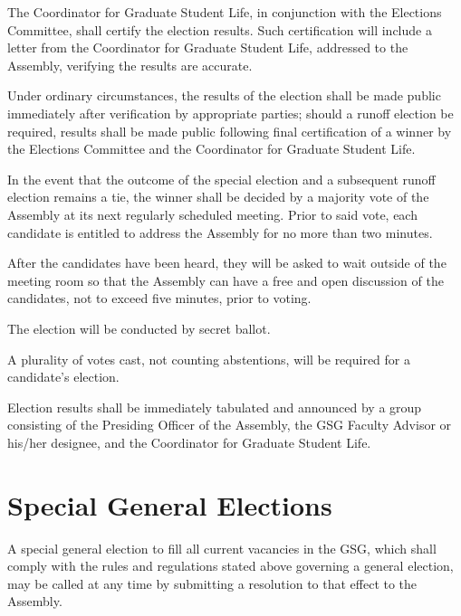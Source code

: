 \begin{bylaws-number}
\begin{bylaws-number}
  \end{bylaws-number}
  \item The Coordinator for Graduate Student Life, in conjunction with the Elections Committee, shall certify the election results. Such certification will include a letter from the Coordinator for Graduate Student Life, addressed to the Assembly, verifying the results are accurate.
  \item Under ordinary circumstances, the results of the election shall be made public immediately after verification by appropriate parties; should a runoff election be required, results shall be made public following final certification of a winner by the Elections Committee and the Coordinator for Graduate Student Life.
  \item In the event that the outcome of the special election and a subsequent runoff election remains a tie, the winner shall be decided by a majority vote of the Assembly at its next regularly scheduled meeting. Prior to said vote, each candidate is entitled to address the Assembly for no more than two minutes.
  \item After the candidates have been heard, they will be asked to wait outside of the meeting room so that the Assembly can have a free and open discussion of the candidates, not to exceed five minutes, prior to voting.
  \item The election will be conducted by secret ballot.
  \item A plurality of votes cast, not counting abstentions, will be required for a candidate’s election.
  \item Election results shall be immediately tabulated and announced by a group consisting of the Presiding Officer of the Assembly, the GSG Faculty Advisor or his/her designee, and the Coordinator for Graduate Student Life.
\end{bylaws-number}

\section{Special General Elections}
A special general election to fill all current vacancies in the GSG, which shall comply with the rules and regulations stated above governing a general election, may be called at any time by submitting a resolution to that effect to the Assembly.

